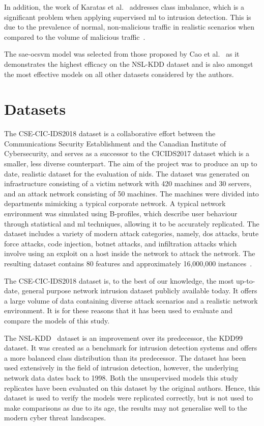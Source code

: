 In addition, the work of Karatas et al.~\cite{Karatas} addresses class
imbalance, which is a significant problem when applying supervised \gls{ml} to
intrusion detection. This is due to the prevalence of normal, non-malicious
traffic in realistic scenarios when compared to the volume of malicious
traffic~\cite{imbalance_prob, imbalance}.

The \gls{sae}-\gls{ocsvm} model was selected from those proposed by Cao et
al.~\cite{Cao} as it demonstrates the highest efficacy on the NSL-KDD dataset
and is also amongst the most effective models on all other datasets considered
by the authors.

\section{Datasets}%
\label{sec:datasets}
The CSE-CIC-IDS2018 dataset is a collaborative effort between the
Communications Security Establishment and the Canadian Institute of
Cybersecurity,
and serves as a successor to the CICIDS2017 dataset which is a smaller, less
diverse counterpart. The aim of the project was to produce an up to date,
realistic dataset for the evaluation of \gls{nids}. The dataset was generated
on infrastructure consisting of a victim network with 420 machines and 30
servers, and an attack network consisting of 50 machines. The machines were
divided into departments mimicking a typical corporate network. A typical
network environment was simulated using B-profiles, which describe user
behaviour through statistical and \gls{ml} techniques, allowing it to be
accurately replicated. The dataset includes a variety of modern attack
categories, namely, \gls{dos} attacks, brute force attacks, code injection,
botnet attacks, and infiltration attacks which involve using an exploit on a
host inside the network to attack the network. The resulting dataset contains
80 features and approximately 16,000,000 instances~\cite{cic2018, cic2018data}.

The CSE-CIC-IDS2018 dataset is, to the best of our knowledge, the most
up-to-date, general purpose network intrusion dataset publicly available today.
It offers a large volume of data containing diverse attack scenarios and a
realistic network environment. It is for these reasons that it has been used to
evaluate and compare the models of this study.

The NSL-KDD~\cite{nsl} dataset is an improvement over its predecessor, the
KDD99 dataset. It was created as a benchmark for intrusion detection systems
and offers a more balanced class distribution than its predecessor. The dataset
has been used extensively in the field of intrusion detection, however, the
underlying network data dates back to 1998. Both the unsupervised models this
study replicates have been evaluated on this dataset by the original authors.
Hence, this dataset is used to verify the models were replicated correctly, but
is not used to make comparisons as due to its age, the results may not
generalise well to the modern cyber threat landscapes.

